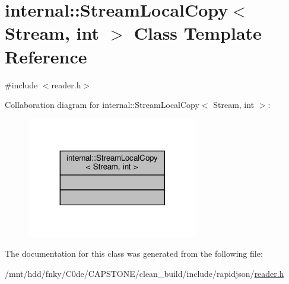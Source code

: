 \hypertarget{classinternal_1_1StreamLocalCopy}{}\section{internal\+:\+:Stream\+Local\+Copy$<$ Stream, int $>$ Class Template Reference}
\label{classinternal_1_1StreamLocalCopy}


{\ttfamily \#include $<$reader.\+h$>$}



Collaboration diagram for internal\+:\+:Stream\+Local\+Copy$<$ Stream, int $>$\+:
\nopagebreak
\begin{figure}[H]
\begin{center}
\leavevmode
\includegraphics[width=212pt]{classinternal_1_1StreamLocalCopy__coll__graph}
\end{center}
\end{figure}


The documentation for this class was generated from the following file\+:\begin{DoxyCompactItemize}
\item 
/mnt/hdd/fnky/\+C0de/\+C\+A\+P\+S\+T\+O\+N\+E/clean\+\_\+build/include/rapidjson/\hyperlink{reader_8h}{reader.\+h}\end{DoxyCompactItemize}
